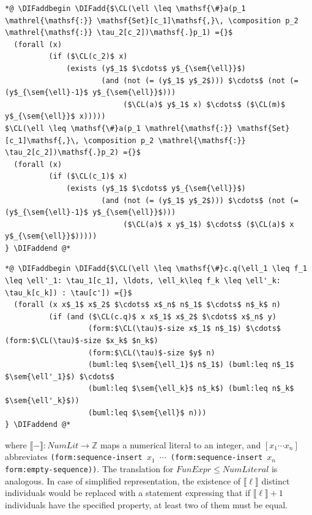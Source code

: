 \documentclass[10pt,fleqn,final]{scrreprt}
\newcommand*{\CL}{\ensuremath{\mathsf{CL}}\xspace}
\newcommand*{\DOL}{\ensuremath{\mathsf{DOL}}\xspace}
\newcommand{\informative}[0]{{\begin{center}{\Large{(Informative})}\end{center}} \bigskip}
\newcommand{\infannex}[1]{ \chapter{Annex: #1}  \informative }
\newenvironment{definitions}[0]{\medskip }{}
\newcommand{\composition}{\raisebox{0.2pt}{\begin{sideways}\fontsize{6pt}{6pt}\selectfont$\blacklozenge$\end{sideways}}}
\newcommand{\ZZ}{\mathbb{Z}}
\newcommand{\sem}[1]{\mathopen\llbracket#1\mathclose\rrbracket}
\providecommand{\DIFadd}[1]{{\protect\color{blue}\uwave{#1}}} %
\providecommand{\DIFaddbegin}{} %
\providecommand{\DIFaddend}{} %
\begin{document}
\begin{definitions}
\begin{lstlisting}[language=clif, mathescape]
*@ \DIFaddbegin \DIFadd{$\CL(\ell \leq \mathsf{\#}a(p_1 \mathrel{\mathsf{:}} \mathsf{Set}[c_1]\mathsf{,}\, \composition p_2 \mathrel{\mathsf{:}} \tau_2[c_2])\mathsf{.}p_1) ={}$
  (forall (x)
          (if ($\CL(c_2)$ x)
              (exists (y$_1$ $\cdots$ y$_{\sem{\ell}}$)
                      (and (not (= (y$_1$ y$_2$))) $\cdots$ (not (= (y$_{\sem{\ell}-1}$ y$_{\sem{\ell}}$)))
                           ($\CL(a)$ y$_1$ x) $\cdots$ ($\CL(m)$ y$_{\sem{\ell}}$ x)))))
$\CL(\ell \leq \mathsf{\#}a(p_1 \mathrel{\mathsf{:}} \mathsf{Set}[c_1]\mathsf{,}\, \composition p_2 \mathrel{\mathsf{:}} \tau_2[c_2])\mathsf{.}p_2) ={}$
  (forall (x)
          (if ($\CL(c_1)$ x)
              (exists (y$_1$ $\cdots$ y$_{\sem{\ell}}$)
                      (and (not (= (y$_1$ y$_2$))) $\cdots$ (not (= (y$_{\sem{\ell}-1}$ y$_{\sem{\ell}}$)))
                           ($\CL(a)$ x y$_1$) $\cdots$ ($\CL(a)$ x y$_{\sem{\ell}}$)))))
} \DIFaddend @*
\end{lstlisting}

\begin{lstlisting}[language=clif, mathescape]
*@ \DIFaddbegin \DIFadd{$\CL(\ell \leq \mathsf{\#}c.q(\ell_1 \leq f_1 \leq \ell'_1: \tau_1[c_1], \ldots, \ell_k\leq f_k \leq \ell'_k: \tau_k[c_k]) : \tau[c']) ={}$
  (forall (x x$_1$ x$_2$ $\cdots$ x$_n$ n$_1$ $\cdots$ n$_k$ n)
          (if (and ($\CL(c.q)$ x x$_1$ x$_2$ $\cdots$ x$_n$ y)
                   (form:$\CL(\tau)$-size x$_1$ n$_1$) $\cdots$ (form:$\CL(\tau)$-size $x_k$ $n_k$)
                   (form:$\CL(\tau)$-size $y$ n)
                   (buml:leq $\sem{\ell_1}$ n$_1$) (buml:leq n$_1$ $\sem{\ell'_1}$) $\cdots$
                   (buml:leq $\sem{\ell_k}$ n$_k$) (buml:leq n$_k$ $\sem{\ell'_k}$))
                   (buml:leq $\sem{\ell}$ n)))
} \DIFaddend @*
\end{lstlisting}
%
where $\sem{-} : \mathit{NumLit} \to \ZZ$
maps a numerical literal to an integer, and $[x_1\cdots x_n]$
abbreviates \texttt{(form:sequence-insert $x_1$
  $\cdots$
  (form:sequence-insert $x_n$
  form:empty-sequence)\DIFaddbegin \DIFadd{$\cdots$}\DIFaddend )}.
The translation for $\mathit{FunExpr} \leq \mathit{NumLiteral}$
is analogous. In case of simplified representation, the existence of
$\sem{\ell}$
distinct individuals would be replaced with a statement expressing that
if $\sem{\ell}+1$
individuals have the specified property, at least two of them must be
equal.




\end{definitions}
\end{document}
